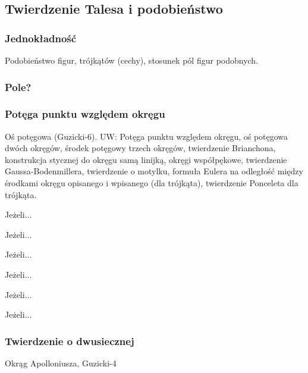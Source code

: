 %

\subsection{Twierdzenie Talesa i podobieństwo}
\subsubsection{Jednokładność}
Podobieństwo figur, trójkątów (cechy), stosunek pól figur podobnych.



\subsubsection{Pole?}




\subsubsection{Potęga punktu względem okręgu}
Oś potęgowa (Guzicki-6).
UW: Potęga punktu względem okręgu, oś potęgowa dwóch okręgów, środek potęgowy trzech okręgów, twierdzenie Brianchona, konstrukcja stycznej do okręgu samą linijką, okręgi współpękowe, twierdzenie Gaussa-Bodenmillera, twierdzenie o motylku, formuła Eulera na odległość między środkami okręgu opisanego i wpisanego (dla trójkąta), twierdzenie Ponceleta dla trójkąta.

\begin{proposition}
	Jeżeli...
\end{proposition}
\begin{definition}
	Jeżeli...
\end{definition}
\begin{proposition}
	Jeżeli...
\end{proposition}
\begin{definition}[oś potęgowa]
	Jeżeli...
\end{definition}
\begin{theorem}[Monge'a]
	Jeżeli...
\end{theorem}
\begin{theorem}[Auberta]
	Jeżeli...
\end{theorem}


\subsubsection{Twierdzenie o dwusiecznej}
Okrąg Apolloniusza, Guzicki-4

